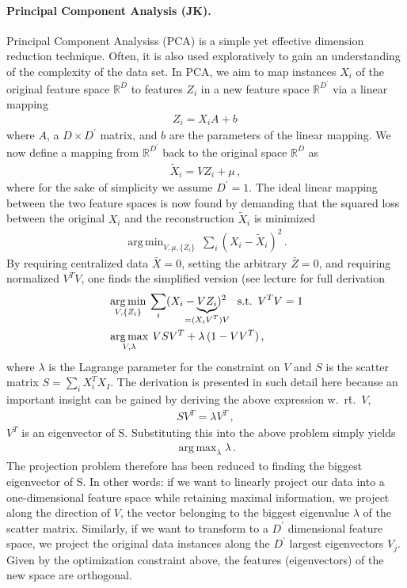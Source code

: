 \documentclass[12pt, a4paper]{scrartcl}
\DeclareMathOperator*{\argmin}{arg\,min}
\DeclareMathOperator*{\argmax}{arg\,max}
\begin{document}
\paragraph{Principal Component Analysis (JK).} Principal Component Analysiss (PCA) is a simple yet effective dimension reduction technique. Often, it is also used exploratively to gain an understanding of the complexity of the data set. In PCA, we aim to map instances $X_i$ of the original feature space $\mathbb{R}^D$ to features $Z_i$ in a new feature space $\mathbb{R}^{D^\prime}$ via a linear mapping
\begin{align}
	Z_i = X_i A + b \, 
\end{align}
where $A$, a $D\times D^\prime$ matrix, and $b$ are the parameters of the linear mapping. We now define a mapping from $\mathbb{R}^{D^\prime}$  back to the original space $\mathbb{R}^D$ as
\begin{align}
	\tilde{X}_i = V Z_i + \mu \, ,
\end{align}
where for the sake of simplicity we assume $D^\prime=1$.
The ideal linear mapping between the two feature spaces is now found by demanding that the squared loss between the original $X_i$ and the reconstruction $\tilde{X}_i$ is minimized
\begin{align}
	\argmin_{V, \mu, \{Z_i\}} \: \sum_i \left( X_i - \tilde{X}_i \right)^2 \, .
\end{align}
By requiring centralized data $\bar{X}=0$, setting the arbitrary $\bar{Z}=0$, and requiring normalized $V^TV$, one finds the simplified version (see lecture for full derivation
\begin{align}
	&\argmin_{V, \{Z_i\}} \: \sum_i ( X_i - 
														\underbrace{V Z_i}_{\mathclap{=(X_i V^T)V}}
														)^2 \quad
														\text{s.t.} \enspace V^TV=1  \\
	&\argmax_{V, \lambda} \: VSV^T + \lambda \,  (1-VV^T) \, ,													\end{align}
where $\lambda$ is the Lagrange parameter for the constraint on $V$ and $S$ is the scatter matrix $S = \sum_i X_i^T X_I$. 
The derivation is presented in such detail here because an important insight can be gained  by deriving the above expression w.\ r\. t.\ $V$,
\begin{align}
	S V^T = \lambda V^T \, ,
\end{align}
$V^T$ is an eigenvector of S. Substituting this into the above problem simply yields
\begin{align}
	\argmax_\lambda \lambda \, .
\end{align}
The projection problem therefore has been reduced to finding the biggest eigenvector of S. In other words: if we want to linearly project our data into a one-dimensional feature space while retaining maximal information, we project along the direction of $V$, the vector belonging to the biggest eigenvalue $\lambda$ of the scatter matrix. Similarly, if we want to transform to a $D^\prime$ dimensional feature space, we project the original data instances along the $D^\prime$ largest eigenvectors $V_j$. Given by the optimization constraint above, the features (eigenvectors) of the new space are orthogonal. 
\end{document}
